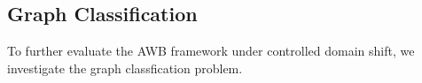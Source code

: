 




\subsection{Graph Classification}
To further evaluate the AWB framework under controlled domain shift, we investigate the graph classfication problem.

